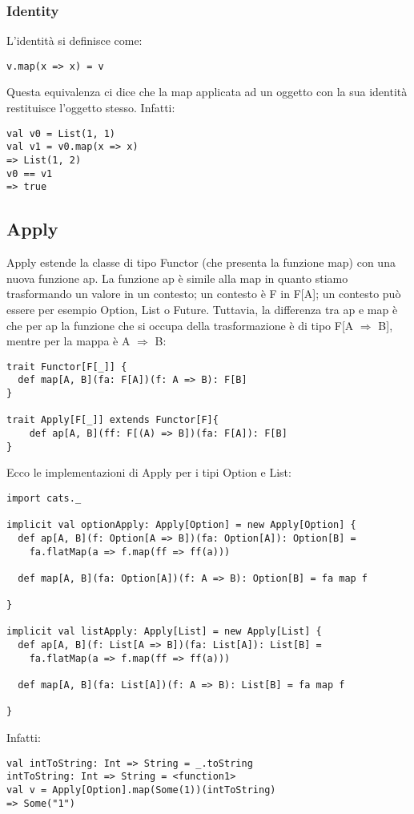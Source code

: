 \subsubsection{Identity}
L'identità si definisce come:
\begin{verbatim}
v.map(x => x) = v
\end{verbatim}
\noindent Questa equivalenza ci dice che la map applicata ad un oggetto con la sua identità restituisce l'oggetto stesso. Infatti:
\begin{verbatim}
val v0 = List(1, 1)
val v1 = v0.map(x => x)
=> List(1, 2)
v0 == v1
=> true
 \end{verbatim}

\subsection{Apply}
Apply estende la classe di tipo Functor (che presenta la funzione map) con una nuova funzione ap. La funzione ap è simile alla map in quanto stiamo trasformando un valore in un contesto; un contesto è F in F[A]; un contesto può essere per esempio Option, List o Future. Tuttavia, la differenza tra ap e map è che per ap la funzione che si occupa della trasformazione è di tipo F[A $\Rightarrow$ B], mentre per la mappa è A $\Rightarrow$ B:
\begin{verbatim}
trait Functor[F[_]] {
  def map[A, B](fa: F[A])(f: A => B): F[B]
}

trait Apply[F[_]] extends Functor[F]{
    def ap[A, B](ff: F[(A) => B])(fa: F[A]): F[B]
}
\end{verbatim}
Ecco le implementazioni di Apply per i tipi Option e List:
\begin{verbatim}
import cats._

implicit val optionApply: Apply[Option] = new Apply[Option] {
  def ap[A, B](f: Option[A => B])(fa: Option[A]): Option[B] =
    fa.flatMap(a => f.map(ff => ff(a)))

  def map[A, B](fa: Option[A])(f: A => B): Option[B] = fa map f

}

implicit val listApply: Apply[List] = new Apply[List] {
  def ap[A, B](f: List[A => B])(fa: List[A]): List[B] =
    fa.flatMap(a => f.map(ff => ff(a)))

  def map[A, B](fa: List[A])(f: A => B): List[B] = fa map f

}
\end{verbatim}

\noindent Infatti:
\begin{verbatim}
val intToString: Int => String = _.toString
intToString: Int => String = <function1>
val v = Apply[Option].map(Some(1))(intToString) 
=> Some("1")
    
\end{verbatim}
